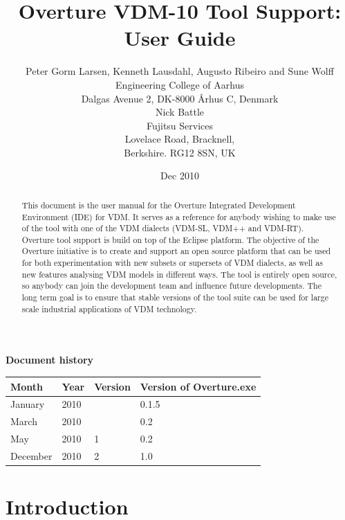 \documentclass{overturerepchap}
\begin{document}
\title{Overture VDM-10 Tool Support: User Guide}
\author{Peter Gorm Larsen, Kenneth Lausdahl, Augusto Ribeiro and Sune Wolff \\ 
Engineering College of Aarhus\\
Dalgas Avenue 2, DK-8000 \AA{}rhus C, Denmark\\[3mm]
Nick Battle\\
Fujitsu Services\\
Lovelace Road, Bracknell, \\
Berkshire. RG12 8SN, UK}

\date{Dec 2010}


\maketitle


\textbf{Document history}

\begin{tabular}{|l|l|l|l|}\hline
Month   & Year & Version & Version of Overture.exe \\ \hline
January & 2010 &         & 0.1.5 \\ \hline
March   & 2010 &         & 0.2   \\ \hline
May     & 2010 & 1       & 0.2   \\ \hline
December& 2010 & 2       & 1.0   \\ \hline
\end{tabular}

\tableofcontents

\begin{abstract}
This document is the user manual for the Overture Integrated Development
Environment (IDE) for
VDM. It serves as a reference for anybody wishing to make use of
the tool with one of the VDM dialects (VDM-SL, VDM++ and VDM-RT).
Overture tool support is build on top of the Eclipse platform. The
objective of the Overture initiative is to create and support an open source
platform that can be used for both experimentation with new subsets or
supersets of VDM dialects, as well as new features analysing VDM
models in different ways. The tool is entirely open source, so anybody
can join the development team and influence future
developments. The long term goal is to ensure that stable
versions of the tool suite can be used for large scale industrial
applications of VDM technology.
\end{abstract}

\chapter{Introduction}
\end{document}
